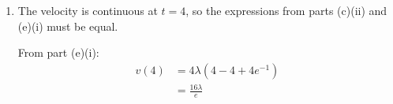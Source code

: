 \documentclass[leqno]{article}
\begin{document}
\begin{enumerate}[
  label=\textbf{\arabic*.},
  leftmargin=*,
  topsep=0pt,
  partopsep=0pt,
  parsep=0pt
]
\begin{djsSolution}
\begin{enumerate}[label=\textbf{(\alph*)}]
\begin{enumerate}[label=(\roman*)]
    Multiplying through by $e^{t/4}$:
    \[
    e^{t/4}\frac{\mathrm{d}v}{\mathrm{d}t} + 0.25e^{t/4}v = \lambda te^{t/4}
    \]

    The left-hand side is the derivative of $ve^{t/4}$, so
    \[
    \frac{\mathrm{d}}{\mathrm{d}t}\left(ve^{t/4}\right)=\lambda te^{t/4}
    \]

    Integrating:
    \[
    ve^{t/4} = \lambda \int te^{t/4}\, \mathrm{d}t + c
    \]

    Evaluate the integral by parts. The formula is
    \[
    \int u\frac{\mathrm{d}w}{\mathrm{d}t}\,\mathrm{d}t=uw-\int w\frac{\mathrm{d}u}{\mathrm{d}t}\,\mathrm{d}t
    \]

    Let
    \[
    u=t,\qquad \frac{\mathrm{d}w}{\mathrm{d}t}=e^{t/4}
    \]

    so that
    \[
    \frac{\mathrm{d}u}{\mathrm{d}t}=1,\qquad w=4e^{t/4}
    \]

    Then
    \begin{align*}
    \int te^{t/4}\, \mathrm{d}t &= 4te^{t/4} - \int 4e^{t/4}\, \mathrm{d}t \\
    &= 4te^{t/4} - 16e^{t/4}
    \end{align*}

    Therefore
    \[
    ve^{t/4} = \lambda\left(4te^{t/4}-16e^{t/4}\right)+c
    \]

    Dividing by $e^{t/4}$:
    \[
    v = 4\lambda(t-4)+ce^{-t/4}
    \]

    The cage starts from rest, so $v(0)=0$. Hence
    \begin{align*}
    0 &= 4\lambda(0-4)+c \\
    0 &= -16\lambda + c \\
    c &= 16\lambda
    \end{align*}

    Substituting back:
    \begin{align*}
    v &= 4\lambda(t-4)+16\lambda e^{-t/4} \\
    &= 4\lambda\left(t-4+4e^{-t/4}\right)
    \end{align*}

    So, for $0 \le t \le 4$:
    \[
    v = 4\lambda\left(t-4+4e^{-t/4}\right)
    \]

    \item The velocity is continuous at $t=4$, so the expressions from parts (c)(ii) and (e)(i) must be equal.

    From part (e)(i):
    \begin{align*}
    v(4) &= 4\lambda\left(4-4+4e^{-1}\right) \\
    &= \frac{16\lambda}{e}
    \end{align*}


\end{enumerate}
\end{enumerate}
\end{djsSolution}
\end{enumerate}
\end{document}

